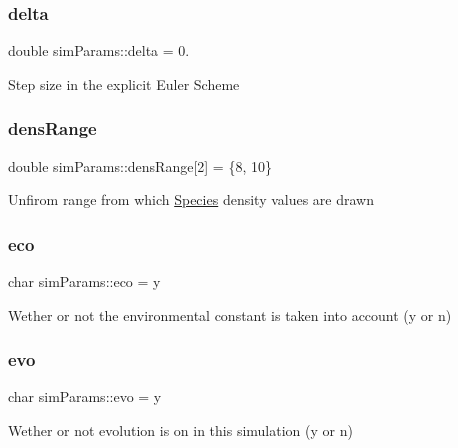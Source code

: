 \subsubsection{\texorpdfstring{delta}{delta}}
{\footnotesize\ttfamily double sim\+Params\+::delta = 0.}

Step size in the explicit Euler Scheme \mbox{\label{structsimParams_a48b3258fb2eabaf36a4392a3be846366}} 
\subsubsection{\texorpdfstring{dens\+Range}{densRange}}
{\footnotesize\ttfamily double sim\+Params\+::dens\+Range\mbox{[}2\mbox{]} = \{8, 10\}}

Unfirom range from which \hyperlink{classSpecies}{Species} density values are drawn \mbox{\label{structsimParams_ac1a96378c33a770e34ffba03498735c9}} 
\subsubsection{\texorpdfstring{eco}{eco}}
{\footnotesize\ttfamily char sim\+Params\+::eco = \textquotesingle{}y\textquotesingle{}}

Wether or not the environmental constant is taken into account (\textquotesingle{}y\textquotesingle{} or \textquotesingle{}n\textquotesingle{}) \mbox{\label{structsimParams_a26cb871bb244145cf0b4d1754864f276}} 
\subsubsection{\texorpdfstring{evo}{evo}}
{\footnotesize\ttfamily char sim\+Params\+::evo = \textquotesingle{}y\textquotesingle{}}

Wether or not evolution is on in this simulation (\textquotesingle{}y\textquotesingle{} or \textquotesingle{}n\textquotesingle{}) \mbox{\label{structsimParams_a328c95295bd7872174fa9a22c9c402cd}} 
